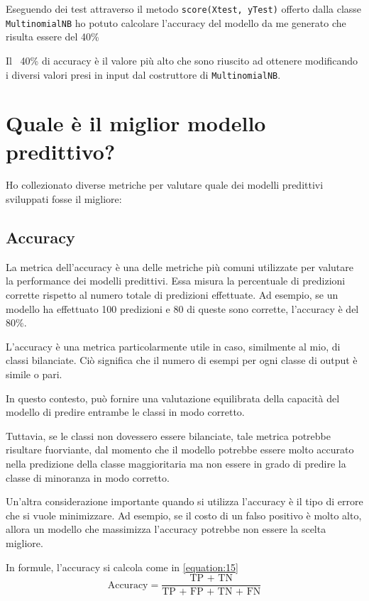Eseguendo dei test attraverso il metodo \mintinline[bgcolor=bg]
{python}{score(Xtest, yTest)} offerto dalla classe \texttt{MultinomialNB} ho potuto calcolare l’accuracy del modello da me generato che risulta essere del 40\%

Il ~40\% di accuracy è il valore più alto che sono riuscito ad ottenere modificando i diversi valori presi in input dal costruttore di \texttt{MultinomialNB}.

\section{Quale è il miglior modello predittivo?}
Ho collezionato diverse metriche per valutare quale dei modelli predittivi sviluppati fosse il migliore: 
\subsection{Accuracy}
La metrica dell'accuracy è una delle metriche più comuni utilizzate per valutare la performance dei modelli predittivi. Essa misura la percentuale di predizioni corrette rispetto al numero totale di predizioni effettuate. Ad esempio, se un modello ha effettuato 100 predizioni e 80 di queste sono corrette, l'accuracy è del 80\%.

L'accuracy è una metrica particolarmente utile in caso, similmente al mio, di classi bilanciate. Ciò significa che il numero di esempi per ogni classe di output è simile o pari. 

In questo contesto, può fornire una valutazione equilibrata della capacità del modello di predire entrambe le classi in modo corretto. 

Tuttavia, se le classi  non dovessero essere bilanciate, tale metrica potrebbe risultare fuorviante, dal momento che il modello potrebbe essere molto accurato nella predizione della classe maggioritaria ma non essere in grado di predire la classe di minoranza in modo corretto.

Un'altra considerazione importante quando si utilizza l'accuracy è il tipo di errore che si vuole minimizzare. Ad esempio, se il costo di un falso positivo è molto alto, allora un modello che massimizza l'accuracy potrebbe non essere la scelta migliore.

In formule, l'accuracy si calcola come in \ref{equation:15}
\begin{equation}
    \text{Accuracy} = \frac{\text{TP + TN}}{\text{TP + FP + TN + FN}}
    \label{equation:15}
\end{equation}

